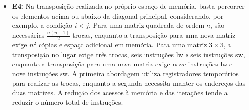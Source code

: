 \documentclass[12pt,a4paper,titlepage]{article}
\begin{document}
\begin{itemize}
    \item\textbf{E4:}
        Na transposição realizada no próprio espaço de memória, basta percorrer os elementos acima ou abaixo da diagonal principal,
        considerando, por exemplo, a condição $i < j$. Para uma matriz quadrada de ordem $n$, são necessárias
        $\frac{n(n-1)}{2}$ trocas, enquanto a transposição para uma nova matriz exige $n^2$ cópias e espaço adicional em memória.
        Para uma matriz $3 \times 3$, a transposição no lugar exige três trocas, seis instruções lw e seis instruções sw,
        enquanto a transposição para uma nova matriz exige nove instruções lw e nove instruções sw.
        A primeira abordagem utiliza registradores temporários para realizar as trocas, enquanto a segunda necessita manter
        os endereços das duas matrizes. A redução dos acessos à memória e das iterações tende a reduzir o número total de instruções.
\end{itemize}
\end{document}
